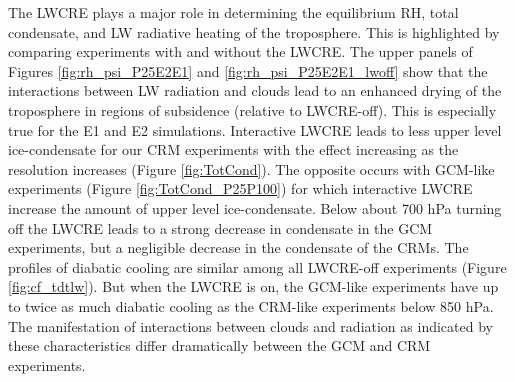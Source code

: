 \documentclass[draft]{agujournal2019}
\begin{document}
{The LWCRE plays a major role in determining the equilibrium RH, total condensate, and LW radiative heating of the troposphere.  
This is highlighted by comparing experiments with and without the LWCRE. %
The upper panels of Figures \ref{fig:rh_psi_P25E2E1} and \ref{fig:rh_psi_P25E2E1_lwoff} show that the 
interactions between LW radiation and clouds lead to an enhanced drying of the troposphere in regions of subsidence (relative to LWCRE-off).  
This is especially true for the E1 and E2 simulations.  
Interactive LWCRE leads to less upper level ice-condensate for our CRM experiments
with the effect increasing as the resolution increases (Figure \ref{fig:TotCond}).  
The opposite occurs with GCM-like experiments (Figure \ref{fig:TotCond_P25P100}) for which interactive LWCRE increase 
the amount of upper level ice-condensate.    
Below about 700 hPa turning off the LWCRE leads to a strong decrease in condensate
in the GCM experiments, but a negligible decrease in the condensate of the CRMs.    
The profiles of diabatic cooling are similar among all LWCRE-off experiments (Figure \ref{fig:cf_tdtlw}).  
But when the LWCRE is on, the GCM-like experiments have up to twice as much diabatic cooling as the CRM-like experiments below 850 hPa.
The manifestation of interactions between clouds and radiation as indicated
by these characteristics differ dramatically between the GCM and CRM experiments.   



}
\end{document}
